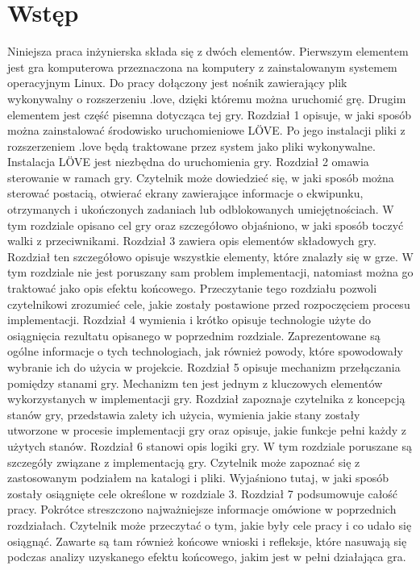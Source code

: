 \chapter*{Wstęp}
Niniejsza praca inżynierska składa się z dwóch elementów. Pierwszym elementem
jest gra komputerowa przeznaczona na komputery z zainstalowanym systemem operacyjnym Linux.
Do pracy dołączony jest nośnik zawierający plik wykonywalny o rozszerzeniu
.love, dzięki któremu można uruchomić grę. Drugim elementem jest część pisemna 
dotycząca tej gry.
Rozdział 1 opisuje, w jaki sposób można zainstalować środowisko uruchomieniowe
LÖVE. Po jego instalacji pliki z rozszerzeniem .love będą traktowane przez
system jako pliki wykonywalne. Instalacja LÖVE jest niezbędna do uruchomienia
gry.
Rozdział 2 omawia sterowanie w ramach gry. Czytelnik może dowiedzieć się, w
jaki sposób można sterować postacią, otwierać ekrany zawierające informacje o
ekwipunku, otrzymanych i ukończonych zadaniach lub odblokowanych
umiejętnościach. W tym rozdziale opisano cel gry oraz szczegółowo objaśniono,
w jaki sposób toczyć walki z przeciwnikami.
Rozdział 3 zawiera opis elementów składowych gry. Rozdział ten szczegółowo
opisuje wszystkie elementy, które znalazły się w grze. W tym rozdziale nie jest
poruszany sam problem implementacji, natomiast można go traktować jako opis
efektu końcowego. Przeczytanie tego rozdziału pozwoli czytelnikowi zrozumieć
cele, jakie zostały postawione przed rozpoczęciem procesu implementacji.
Rozdział 4 wymienia i krótko opisuje technologie użyte do osiągnięcia rezultatu
opisanego w poprzednim rozdziale. Zaprezentowane są ogólne informacje o tych
technologiach, jak również powody, które spowodowały wybranie ich do użycia w
projekcie.
Rozdział 5 opisuje mechanizm przełączania pomiędzy stanami gry. Mechanizm ten
jest jednym z kluczowych elementów wykorzystanych w implementacji gry. Rozdział
zapoznaje czytelnika z koncepcją stanów gry, przedstawia zalety ich użycia,
wymienia jakie stany zostały utworzone w procesie implementacji gry oraz opisuje, jakie
funkcje pełni każdy z użytych stanów.
Rozdział 6 stanowi opis logiki gry. W tym rozdziale poruszane są szczegóły
związane z implementacją gry. Czytelnik może zapoznać się z zastosowanym
podziałem na katalogi i pliki. Wyjaśniono tutaj, w jaki sposób zostały osiągnięte cele
określone w rozdziale 3.
Rozdział 7 podsumowuje całość pracy. Pokrótce streszczono najważniejsze
informacje omówione w poprzednich rozdziałach. Czytelnik może przeczytać o tym, jakie
były cele pracy i co udało się osiągnąć. Zawarte są tam również końcowe wnioski
i refleksje, które nasuwają się podczas analizy uzyskanego efektu końcowego,
jakim jest w pełni działająca gra.